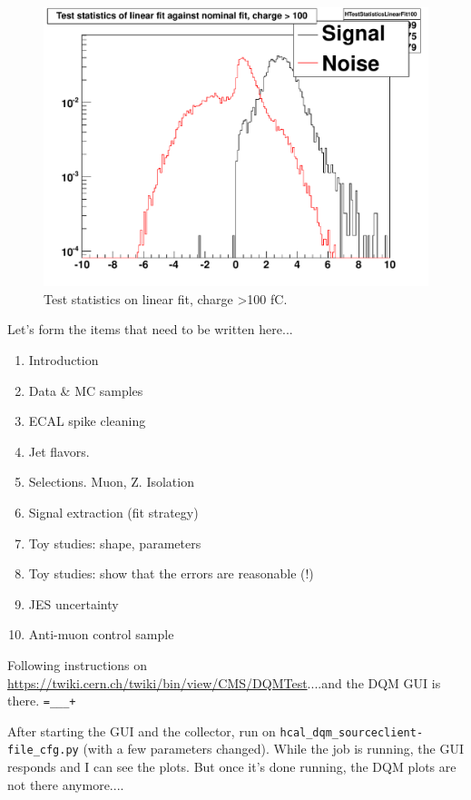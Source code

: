 \begin{figure}
\includegraphics[width=120mm]{DailyLog/6311/6311HTestStatisticsLinearFit100.pdf}
\caption{Test statistics on linear fit, charge \textgreater 100 fC.}
\label{Figure_6311HTestStatisticsLinearFit100}
\end{figure}


Let's form the items that need to be written here...

\begin{enumerate}
\item Introduction
\item Data \& MC samples
\item ECAL spike cleaning
\item Jet flavors.
\item Selections.  Muon, Z.  Isolation
\item Signal extraction (fit strategy)
\item Toy studies: shape, parameters
\item Toy studies: show that the errors are reasonable (!)
\item JES uncertainty
\item Anti-muon control sample
\end{enumerate}


Following instructions on \url{https://twiki.cern.ch/twiki/bin/view/CMS/DQMTest}....and the DQM GUI is there. \texttt{=\_\_\_+}

After starting the GUI and the collector, run on \texttt{hcal\_dqm\_sourceclient-file\_cfg.py} (with a few parameters changed).
While the job is running, the GUI responds and I can see the plots.  But once it's done running, the DQM plots are not there anymore....

